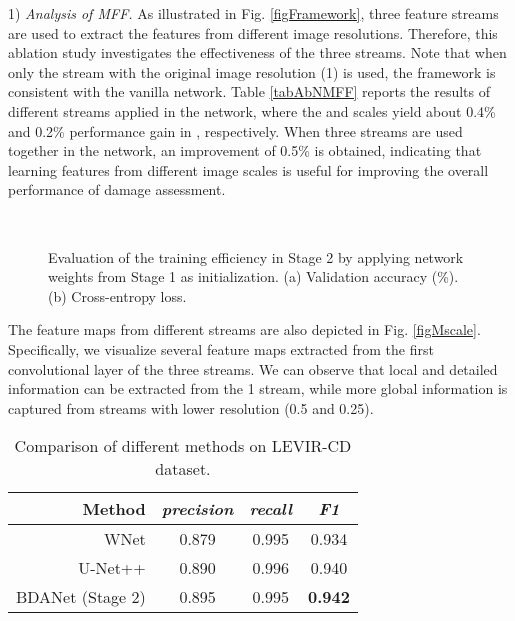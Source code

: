 \documentclass[journal]{IEEEtran}
\begin{document}
1) \textit{Analysis of MFF.} As illustrated in Fig. \ref{figFramework}, three feature streams are used to extract the features from different image resolutions. Therefore, this ablation study investigates the effectiveness of the three streams. Note that when only the stream with the original image resolution (1) is used, the framework is consistent with the vanilla network. Table \ref{tabAbNMFF} reports the results of different streams applied in the network, where the  and  scales yield about 0.4\% and 0.2\% performance gain in ,
respectively. When three streams are used together in the network, an improvement of 0.5\% is obtained, indicating that learning features from different image scales is useful for improving the overall performance of damage assessment.

\begin{figure}[t]
	\centering
	           \\
	\caption{Evaluation of the training efficiency in Stage 2 by applying network weights from Stage 1 as initialization. (a) Validation accuracy (\%). (b) Cross-entropy loss. }
	\label{figCurve}
\end{figure}

The feature maps from different streams are also depicted in Fig. \ref{figMscale}. Specifically, we visualize several feature maps extracted from the first convolutional layer of the three streams.  We can observe that local and detailed information can be extracted from the 1 stream, while more global information is captured from streams with lower resolution (0.5 and 0.25).



\begin{table}[t]
	\centering
	\caption{Comparison of different methods on LEVIR-CD dataset.}
	\setlength{\tabcolsep}{2.6mm} {
		\begin{tabular}{r|ccc}
			\hline \hline
		Method & \textit{precision} & \textit{recall} & \textit{F1} \\
		\hline
	     WNet \cite{houWNetCDGANBitemporal2020} &0.879 &	 0.995 &	0.934  \\
        U-Net++ \cite{pengEndtoEndChangeDetection2019} & 0.890 &	0.996	&0.940  \\
	BDANet (Stage 2) & 0.895 	& 0.995	& \textbf{0.942}  \\
\hline	\hline	
	\end{tabular}}
	\label{tabCD}
\end{table}
\end{document}
